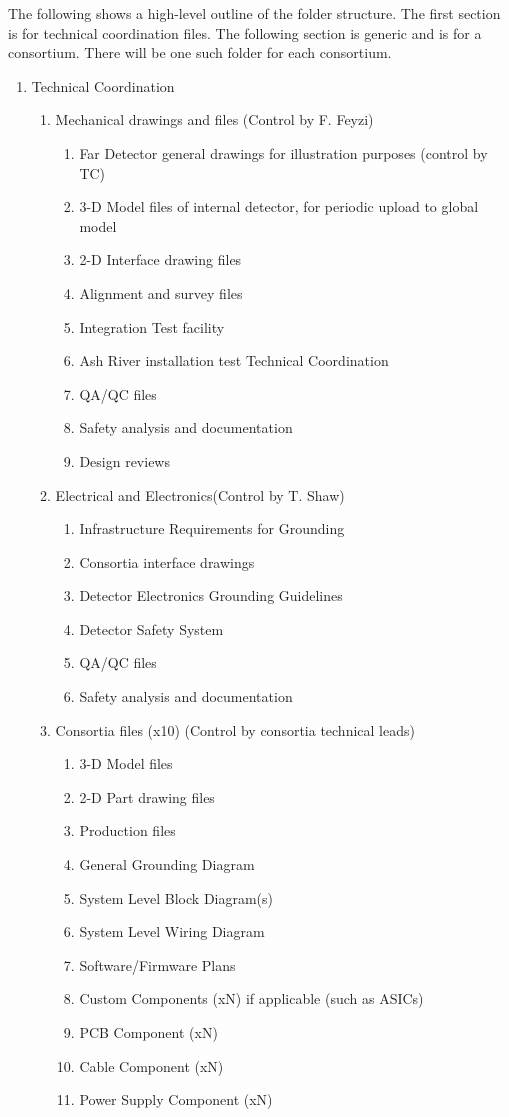 The following shows a high-level outline of the folder structure. The
first section is for technical coordination files. The following
section is generic and is for a consortium. There will be one such
folder for each consortium.
\begin{enumerate}
 \item Technical Coordination
 \begin{enumerate}
  \item Mechanical drawings and files (Control by F. Feyzi)
  \begin{enumerate}
    \item Far Detector general drawings for illustration purposes (control by TC)
    \item 3-D Model files of internal detector, for periodic upload to global model
    \item 2-D Interface drawing files    
    \item Alignment and survey files
    \item Integration Test facility
    \item Ash River installation test Technical Coordination
    \item QA/QC files
    \item Safety analysis and documentation
    \item Design reviews
  \end{enumerate}
  \item Electrical and Electronics(Control by T. Shaw)
  \begin{enumerate}
    \item Infrastructure Requirements for Grounding
    \item Consortia interface drawings
    \item Detector Electronics Grounding Guidelines
    \item Detector Safety System
    \item QA/QC files
    \item Safety analysis and documentation
  \end{enumerate}
  \item Consortia files (x10) (Control by consortia technical leads)
  \begin{enumerate}
    \item 3-D Model files
    \item 2-D Part drawing files
    \item Production files
    \item General Grounding Diagram
    \item System Level Block Diagram(s)
    \item System Level Wiring Diagram
    \item Software/Firmware Plans
    \item Custom Components (xN) if applicable (such as ASICs)
    \item PCB Component (xN)
    \item Cable Component (xN)
    \item Power Supply Component (xN)
  \end{enumerate}
 \end{enumerate}
\end{enumerate}
